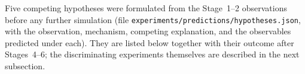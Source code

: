 Five competing hypotheses were formulated from the Stage~1--2 observations before any further simulation (file \texttt{experiments/predictions/hypotheses.json}, with the observation, mechanism, competing explanation, and the observables predicted under each). They are listed below together with their outcome after Stages~4--6; the discriminating experiments themselves are described in the next subsection.
